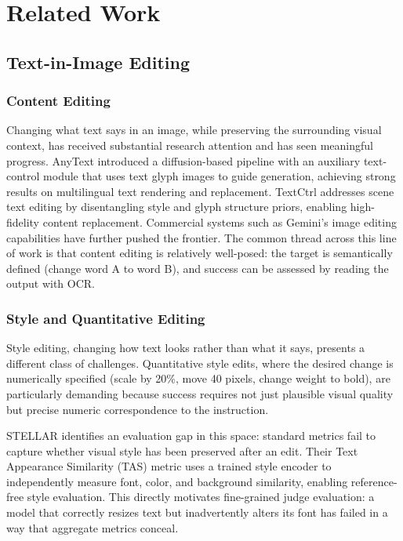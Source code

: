 \chapter{Related Work} \label{Related Work}

\section{Text-in-Image Editing}

\label{Text-in-Image Editing}

\subsection{Content Editing}

Changing what text says in an image, while preserving the surrounding visual context, has received substantial research attention and has seen meaningful progress. AnyText \cite{tuo2024anytext} introduced a diffusion-based pipeline with an auxiliary text-control module that uses text glyph images to guide generation, achieving strong results on multilingual text rendering and replacement. TextCtrl \cite{zeng2024textctrl} addresses scene text editing by disentangling style and glyph structure priors, enabling high-fidelity content replacement. Commercial systems such as Gemini's image editing capabilities \cite{google2025nanobanana} have further pushed the frontier. The common thread across this line of work is that content editing is relatively well-posed: the target is semantically defined (change word A to word B), and success can be assessed by reading the output with OCR.

\subsection{Style and Quantitative Editing}

Style editing, changing how text looks rather than what it says, presents a different class of challenges. Quantitative style edits, where the desired change is numerically specified (scale by 20\%, move 40 pixels, change weight to bold), are particularly demanding because success requires not just plausible visual quality but precise numeric correspondence to the instruction.

STELLAR \cite{seo2025stellar} identifies an evaluation gap in this space: standard metrics fail to capture whether visual style has been preserved after an edit. Their Text Appearance Similarity (TAS) metric uses a trained style encoder to independently measure font, color, and background similarity, enabling reference-free style evaluation. This directly motivates fine-grained judge evaluation: a model that correctly resizes text but inadvertently alters its font has failed in a way that aggregate metrics conceal.

